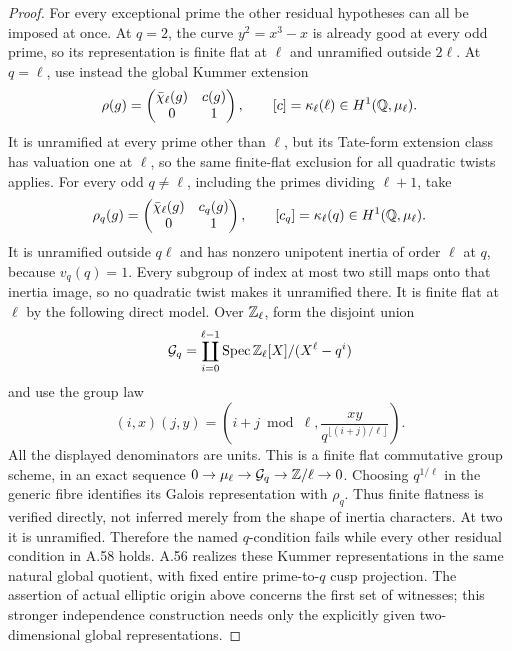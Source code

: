 \begin{proof}
For every exceptional prime the other residual hypotheses can all be
imposed at once. At $q=2$, the curve $y^2=x^3-x$ is already
good at every odd prime, so its representation is finite flat at
$\ell$ and unramified outside $2\ell$. At $q=\ell$, use instead the
global Kummer extension
\[
 \rho(g)=\begin{pmatrix}\bar\chi_\ell(g)&c(g)\\0&1\end{pmatrix},
 \qquad [c]=\kappa_\ell(\ell)\in H^1(\mathbb Q,\mu_\ell).
\]
It is unramified at every prime other than $\ell$, but its Tate-form
extension class has valuation one at $\ell$, so the same finite-flat
exclusion for all quadratic twists applies. For every odd
$q\ne\ell$, including the primes dividing $\ell+1$, take
\[
 \rho_q(g)=\begin{pmatrix}\bar\chi_\ell(g)&c_q(g)\\0&1\end{pmatrix},
 \qquad[c_q]=\kappa_\ell(q)\in H^1(\mathbb Q,\mu_\ell).
\]
It is unramified outside $q\ell$ and has nonzero unipotent inertia
of order $\ell$ at $q$, because $v_q(q)=1$. Every subgroup of index
at most two still maps onto that inertia image, so no quadratic
twist makes it unramified there. It is finite flat at $\ell$ by the
following direct model. Over $\mathbb Z_\ell$, form the disjoint union
\[
 \mathcal G_q=\coprod_{i=0}^{\ell-1}
       \operatorname{Spec}\mathbb Z_\ell[X]/(X^\ell-q^i)
\]
and use the group law
\[
 (i,x)(j,y)=
 \left(i+j\bmod\ell,\frac{xy}{q^{\lfloor(i+j)/\ell\rfloor}}\right).
\]
All the displayed denominators are units. This is a finite flat
commutative group scheme, in an exact sequence
$0\to\mu_\ell\to\mathcal G_q\to\mathbb Z/\ell\to0$.
Choosing $q^{1/\ell}$ in the generic fibre identifies its Galois
representation with $\rho_q$. Thus finite flatness is verified
directly, not inferred merely from the shape of inertia characters.
At two it is unramified. Therefore the named $q$-condition fails
while every other residual condition in A.58 holds. A.56 realizes
these Kummer representations in the same natural global quotient,
with fixed entire prime-to-$q$ cusp projection. The assertion of
actual elliptic origin above concerns the first set of witnesses;
this stronger independence construction needs only the explicitly
given two-dimensional global representations.
\end{proof}

